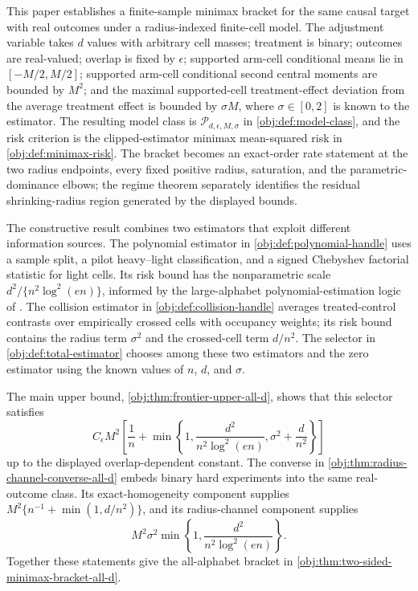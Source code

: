 This paper establishes a finite-sample minimax bracket for the same causal target with real outcomes under a radius-indexed finite-cell model. The adjustment variable takes \(d\) values with arbitrary cell masses; treatment is binary; outcomes are real-valued; overlap is fixed by \(\epsilon\); supported arm-cell conditional means lie in \([-M/2,M/2]\); supported arm-cell conditional second central moments are bounded by \(M^2\); and the maximal supported-cell treatment-effect deviation from the average treatment effect is bounded by \(\sigma M\), where \(\sigma\in[0,2]\) is known to the estimator. The resulting model class is \(\mathcal P_{d,\epsilon,M,\sigma}\) in \cref{obj:def:model-class}, and the risk criterion is the clipped-estimator minimax mean-squared risk in \cref{obj:def:minimax-risk}. The bracket becomes an exact-order rate statement at the two radius endpoints, every fixed positive radius, saturation, and the parametric-dominance elbows; the regime theorem separately identifies the residual shrinking-radius region generated by the displayed bounds.

The constructive result combines two estimators that exploit different information sources. The polynomial estimator in \cref{obj:def:polynomial-handle} uses a sample split, a pilot heavy--light classification, and a signed Chebyshev factorial statistic for light cells. Its risk bound has the nonparametric scale \(d^2/\{n^2\log^2(en)\}\), informed by the large-alphabet polynomial-estimation logic of \citet{JiaoVenkatHanWeissman2015,WuYang2016Entropy}. The collision estimator in \cref{obj:def:collision-handle} averages treated-control contrasts over empirically crossed cells with occupancy weights; its risk bound contains the radius term \(\sigma^2\) and the crossed-cell term \(d/n^2\). The selector in \cref{obj:def:total-estimator} chooses among these two estimators and the zero estimator using the known values of \(n\), \(d\), and \(\sigma\).

The main upper bound, \cref{obj:thm:frontier-upper-all-d}, shows that this selector satisfies
\[
C_\epsilon M^2
\left[
\frac1n+
\min\left\{
1,\frac{d^2}{n^2\log^2(en)},\sigma^2+\frac d{n^2}
\right\}
\right]
\]
up to the displayed overlap-dependent constant. The converse in \cref{obj:thm:radius-channel-converse-all-d} embeds binary hard experiments into the same real-outcome class. Its exact-homogeneity component supplies \(M^2\{n^{-1}+\min(1,d/n^2)\}\), and its radius-channel component supplies
\[
M^2\sigma^2
\min\left\{1,\frac{d^2}{n^2\log^2(en)}\right\}.
\]
Together these statements give the all-alphabet bracket in \cref{obj:thm:two-sided-minimax-bracket-all-d}.

